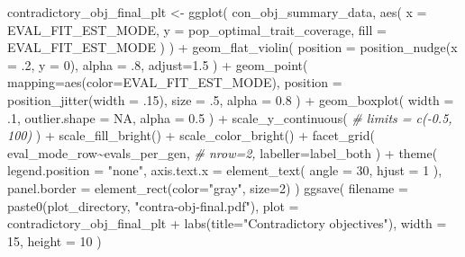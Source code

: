 \documentclass[
]{book}
\newenvironment{Shaded}{\begin{snugshade}}{\end{snugshade}}
\newcommand{\AttributeTok}[1]{\textcolor[rgb]{0.77,0.63,0.00}{#1}}
\newcommand{\CommentTok}[1]{\textcolor[rgb]{0.56,0.35,0.01}{\textit{#1}}}
\newcommand{\ConstantTok}[1]{\textcolor[rgb]{0.00,0.00,0.00}{#1}}
\newcommand{\DecValTok}[1]{\textcolor[rgb]{0.00,0.00,0.81}{#1}}
\newcommand{\FloatTok}[1]{\textcolor[rgb]{0.00,0.00,0.81}{#1}}
\newcommand{\FunctionTok}[1]{\textcolor[rgb]{0.00,0.00,0.00}{#1}}
\newcommand{\NormalTok}[1]{#1}
\newcommand{\OtherTok}[1]{\textcolor[rgb]{0.56,0.35,0.01}{#1}}
\newcommand{\SpecialCharTok}[1]{\textcolor[rgb]{0.00,0.00,0.00}{#1}}
\newcommand{\StringTok}[1]{\textcolor[rgb]{0.31,0.60,0.02}{#1}}
\begin{document}
\begin{Shaded}
\begin{Highlighting}[]
\NormalTok{contradictory\_obj\_final\_plt }\OtherTok{\textless{}{-}} \FunctionTok{ggplot}\NormalTok{(}
\NormalTok{    con\_obj\_summary\_data,}
    \FunctionTok{aes}\NormalTok{(}
      \AttributeTok{x =}\NormalTok{ EVAL\_FIT\_EST\_MODE,}
      \AttributeTok{y =}\NormalTok{ pop\_optimal\_trait\_coverage,}
      \AttributeTok{fill =}\NormalTok{ EVAL\_FIT\_EST\_MODE}
\NormalTok{    )}
\NormalTok{  ) }\SpecialCharTok{+}
  \FunctionTok{geom\_flat\_violin}\NormalTok{(}
    \AttributeTok{position =} \FunctionTok{position\_nudge}\NormalTok{(}\AttributeTok{x =}\NormalTok{ .}\DecValTok{2}\NormalTok{, }\AttributeTok{y =} \DecValTok{0}\NormalTok{),}
    \AttributeTok{alpha =}\NormalTok{ .}\DecValTok{8}\NormalTok{,}
    \AttributeTok{adjust=}\FloatTok{1.5}
\NormalTok{  ) }\SpecialCharTok{+}
  \FunctionTok{geom\_point}\NormalTok{(}
    \AttributeTok{mapping=}\FunctionTok{aes}\NormalTok{(}\AttributeTok{color=}\NormalTok{EVAL\_FIT\_EST\_MODE),}
    \AttributeTok{position =} \FunctionTok{position\_jitter}\NormalTok{(}\AttributeTok{width =}\NormalTok{ .}\DecValTok{15}\NormalTok{),}
    \AttributeTok{size =}\NormalTok{ .}\DecValTok{5}\NormalTok{,}
    \AttributeTok{alpha =} \FloatTok{0.8}
\NormalTok{  ) }\SpecialCharTok{+}
  \FunctionTok{geom\_boxplot}\NormalTok{(}
    \AttributeTok{width =}\NormalTok{ .}\DecValTok{1}\NormalTok{,}
    \AttributeTok{outlier.shape =} \ConstantTok{NA}\NormalTok{,}
    \AttributeTok{alpha =} \FloatTok{0.5}
\NormalTok{  ) }\SpecialCharTok{+}
  \FunctionTok{scale\_y\_continuous}\NormalTok{(}
    \CommentTok{\# limits = c({-}0.5, 100)}
\NormalTok{  ) }\SpecialCharTok{+}
  \FunctionTok{scale\_fill\_bright}\NormalTok{() }\SpecialCharTok{+}
  \FunctionTok{scale\_color\_bright}\NormalTok{() }\SpecialCharTok{+}
  \FunctionTok{facet\_grid}\NormalTok{(}
\NormalTok{    eval\_mode\_row}\SpecialCharTok{\textasciitilde{}}\NormalTok{evals\_per\_gen,}
    \CommentTok{\# nrow=2,}
    \AttributeTok{labeller=}\NormalTok{label\_both}
\NormalTok{  ) }\SpecialCharTok{+}
  \FunctionTok{theme}\NormalTok{(}
    \AttributeTok{legend.position =} \StringTok{"none"}\NormalTok{,}
    \AttributeTok{axis.text.x =} \FunctionTok{element\_text}\NormalTok{(}
      \AttributeTok{angle =} \DecValTok{30}\NormalTok{,}
      \AttributeTok{hjust =} \DecValTok{1}
\NormalTok{    ),}
    \AttributeTok{panel.border =} \FunctionTok{element\_rect}\NormalTok{(}\AttributeTok{color=}\StringTok{"gray"}\NormalTok{, }\AttributeTok{size=}\DecValTok{2}\NormalTok{)}
\NormalTok{  )}
\FunctionTok{ggsave}\NormalTok{(}
  \AttributeTok{filename =} \FunctionTok{paste0}\NormalTok{(plot\_directory, }\StringTok{"contra{-}obj{-}final.pdf"}\NormalTok{),}
  \AttributeTok{plot =}\NormalTok{ contradictory\_obj\_final\_plt }\SpecialCharTok{+} \FunctionTok{labs}\NormalTok{(}\AttributeTok{title=}\StringTok{"Contradictory objectives"}\NormalTok{),}
  \AttributeTok{width =} \DecValTok{15}\NormalTok{,}
  \AttributeTok{height =} \DecValTok{10}
\NormalTok{)}
\end{Highlighting}
\end{Shaded}
\end{document}

